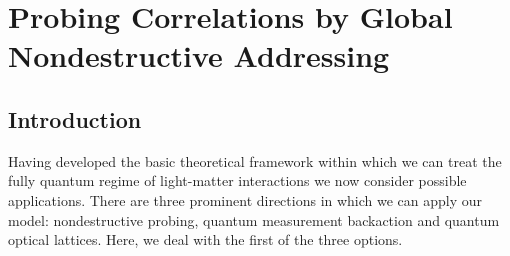 
\chapter{Probing Correlations by Global 
Nondestructive Addressing} %

\ifpdf
    \graphicspath{{Chapter3/Figs/Raster/}{Chapter3/Figs/PDF/}{Chapter3/Figs/}}
\else
    \graphicspath{{Chapter3/Figs/Vector/}{Chapter3/Figs/}}
\fi



\section{Introduction}

Having developed the basic theoretical framework within which we can
treat the fully quantum regime of light-matter interactions we now
consider possible applications. There are three prominent directions
in which we can apply our model: nondestructive probing, quantum
measurement backaction and quantum optical lattices. Here, we deal
with the first of the three options.


